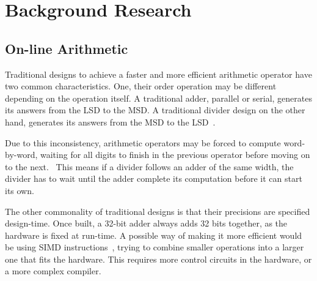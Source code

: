 \section{Background Research}

\subsection{On-line Arithmetic}
Traditional designs to achieve a faster and more efficient arithmetic
operator have two common characteristics.
One, their order operation may be different depending on the operation itself.
A traditional adder, parallel or serial, generates its answers from the LSD to
the MSD.
A traditional divider design on the other hand, generates its answers from
the MSD to the LSD~\cite{Brent1}\cite{Srinivas1}.

Due to this inconsistency, arithmetic operators may be forced to compute
word-by-word, waiting for all digits to finish in the previous operator before
moving on to the next.~\cite{Zhao1}
This means if a divider follows an adder of the same width, the divider has to
wait until the adder complete its computation before it can start its own.

The other commonality of traditional designs is that their precisions are
specified design-time. Once built, a 32-bit adder always adds 32 bits together,
as the hardware is fixed at run-time.
A possible way of making it more efficient would be using SIMD
instructions~\cite{Duncan1}, trying to combine smaller operations into a larger
one that fits the hardware.
This requires more control circuits in the hardware, or a more complex compiler.

